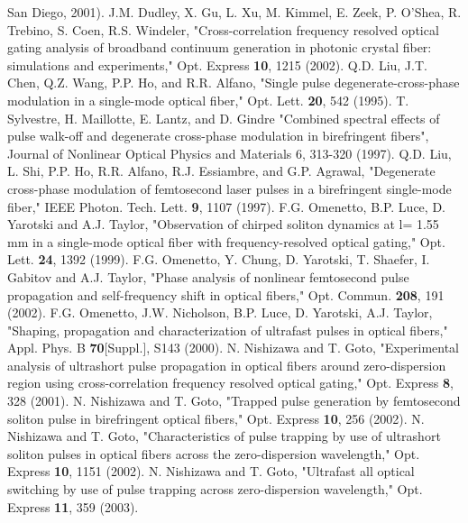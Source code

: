 \begin{thebibliography}{99}
San Diego, 2001).
 J.M. Dudley, X. Gu, L. Xu, M. Kimmel, E. Zeek, P. O'Shea, R. Trebino, S. Coen, R.S. Windeler, "Cross-correlation frequency resolved optical gating analysis of broadband continuum generation in photonic crystal fiber: simulations and experiments," Opt. Express \textbf{10}, 1215 (2002).
 Q.D. Liu, J.T. Chen, Q.Z. Wang, P.P. Ho, and R.R. Alfano, "Single pulse degenerate-cross-phase modulation in a single-mode optical fiber," Opt. Lett. \textbf{20}, 542 (1995).
 T. Sylvestre, H. Maillotte, E. Lantz, and D. Gindre "Combined spectral effects of pulse walk-off and degenerate cross-phase modulation in birefringent fibers", Journal of Nonlinear Optical Physics and Materials 6, 313-320 (1997).
 Q.D. Liu, L. Shi, P.P. Ho, R.R. Alfano, R.J. Essiambre, and G.P. Agrawal, "Degenerate cross-phase modulation of femtosecond laser pulses in a birefringent single-mode fiber," IEEE Photon. Tech. Lett. \textbf{9}, 1107 (1997).
 F.G. Omenetto, B.P. Luce, D. Yarotski and A.J. Taylor, "Observation of chirped soliton dynamics at l= 1.55 mm in a single-mode optical fiber with frequency-resolved optical gating," Opt. Lett. \textbf{24}, 1392 (1999).
 F.G. Omenetto, Y. Chung, D. Yarotski, T. Shaefer, I. Gabitov and A.J. Taylor, "Phase analysis of nonlinear femtosecond pulse propagation and self-frequency shift in optical fibers," Opt. Commun. \textbf{208}, 191 (2002).
 F.G. Omenetto, J.W. Nicholson, B.P. Luce, D. Yarotski, A.J. Taylor, "Shaping, propagation and characterization of ultrafast pulses in optical fibers," Appl. Phys. B \textbf{70}[Suppl.], S143 (2000).
 N. Nishizawa and T. Goto, "Experimental analysis of ultrashort pulse propagation in optical fibers around zero-dispersion region using cross-correlation frequency resolved optical gating," Opt. Express \textbf{8}, 328 (2001).
 N. Nishizawa and T. Goto, "Trapped pulse generation by femtosecond soliton pulse in birefringent optical fibers," Opt. Express \textbf{10}, 256 (2002).
 N. Nishizawa and T. Goto, "Characteristics of pulse trapping by use of ultrashort soliton pulses in optical fibers across the zero-dispersion wavelength," Opt. Express \textbf{10}, 1151 (2002).
 N. Nishizawa and T. Goto, "Ultrafast all optical switching by use of pulse trapping across zero-dispersion wavelength," Opt. Express \textbf{11}, 359 (2003).

\end{thebibliography}
